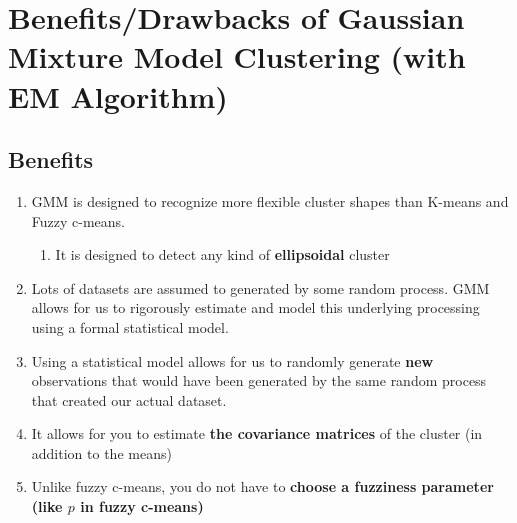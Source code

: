 \documentclass[11pt]{elegantbook}
\begin{document}
\section{Benefits/Drawbacks of Gaussian Mixture Model Clustering (with EM Algorithm)}
\subsection*{Benefits}
\begin{enumerate}[$\bullet$]
    \item GMM is designed to recognize more flexible cluster shapes than K-means and Fuzzy c-means.
    \begin{enumerate}[$\circ$]
        \item It is designed to detect any kind of \textbf{ellipsoidal} cluster
    \end{enumerate}
    \item Lots of datasets are assumed to generated by some random process. GMM allows for us to rigorously estimate and model this underlying processing using a formal statistical model.
    \item Using a statistical model allows for us to randomly generate \textbf{new} observations that would have been generated by the same random process that created our actual dataset.
    \item It allows for you to estimate \textbf{the covariance matrices} of the cluster (in addition to the means)
    \item Unlike fuzzy c-means, you do not have to \textbf{choose a fuzziness parameter (like $p$ in fuzzy c-means)}
\end{enumerate}
\end{document}
